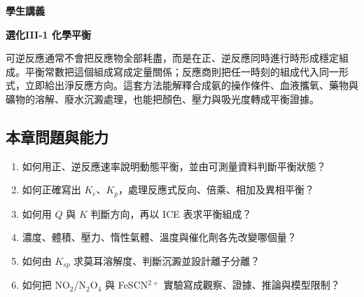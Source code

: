 \documentclass[11pt,a4paper]{article}
\providecommand{\tightlist}{%
  \setlength{\itemsep}{0pt}\setlength{\parskip}{0pt}}
\begin{document}
\begin{tcolorbox}[
  enhanced,colback=white,colframe=HandoutBlue,boxrule=1.1pt,arc=2mm,
  borderline west={3pt}{0pt}{HandoutBlue},left=5mm,right=4mm,top=4mm,bottom=4mm
]
{\sffamily\small\bfseries\color{HandoutBlue}學生講義}\par
{\sffamily\bfseries\LARGE\color{HandoutInk}選化III-1 化學平衡}\par
\vspace{0.35em}{\large 由正、逆反應速率與反應商，預測平衡組成如何受濃度、壓力、溫度與溶解條件控制}\par
{}\par
{}\par
\end{tcolorbox}


可逆反應通常不會把反應物全部耗盡，而是在正、逆反應同時進行時形成穩定組成。平衡常數把這個組成寫成定量關係；反應商則把任一時刻的組成代入同一形式，立即給出淨反應方向。這套方法能解釋合成氨的操作條件、血液攜氧、藥物與礦物的溶解、廢水沉澱處理，也能把顏色、壓力與吸光度轉成平衡證據。

\begin{HandoutLearningMap}

\subsection{本章問題與能力}\label{ux672cux7ae0ux554fux984cux8207ux80fdux529b}

\begin{enumerate}
\def\labelenumi{\arabic{enumi}.}
\tightlist
\item
  如何用正、逆反應速率說明動態平衡，並由可測量資料判斷平衡狀態？
\item
  如何正確寫出 \(K_c\)、\(K_p\)，處理反應式反向、倍乘、相加及異相平衡？
\item
  如何用 \(Q\) 與 \(K\) 判斷方向，再以 ICE 表求平衡組成？
\item
  濃度、體積、壓力、惰性氣體、溫度與催化劑各先改變哪個量？
\item
  如何由 \(K_{sp}\) 求莫耳溶解度、判斷沉澱並設計離子分離？
\item
  如何把 NO\(_2\)/N\(_2\)O\(_4\) 與 FeSCN\(^{2+}\) 實驗寫成觀察、證據、推論與模型限制？
\end{enumerate}

\end{HandoutLearningMap}
\end{document}

